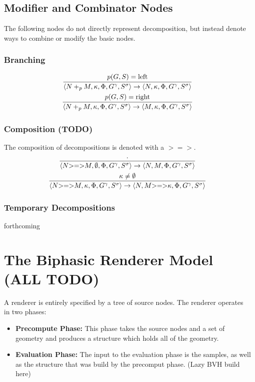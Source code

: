 \documentclass{article}
\newcommand {\comp}{\mathtt{>=>}}
\begin{document}
\subsection{Modifier and Combinator Nodes}
The following nodes do not directly represent decomposition, but instead denote ways to combine or modify the basic nodes.

\subsubsection{Branching}
\begin{gather}
\infer{\langle N +_p M, \kappa, \Phi, G^\gamma, S^\sigma\rangle \to \langle N, \kappa, \Phi, G^\gamma, S^\sigma \rangle}{p(G,S) = \mathrm{left}}
\\
\infer{\langle N +_p M, \kappa, \Phi, G^\gamma, S^\sigma\rangle \to \langle M, \kappa, \Phi, G^\gamma, S^\sigma \rangle}{p(G,S) = \mathrm{right}}
\end{gather}

\subsubsection{Composition (TODO)}
The composition of decompositions is denoted with a $\comp$. 
\begin{gather}
\infer{\langle N \comp M, \emptyset, \Phi, G^\gamma, S^\sigma \rangle \to \langle  N, M, \Phi, G^\gamma, S^\sigma \rangle}{\cdot}
\\
\infer{\langle N \comp M, \kappa, \Phi, G^\gamma, S^\sigma \rangle \to \langle  N, M \comp \kappa, \Phi, G^\gamma, S^\sigma \rangle}{ \kappa \not = \emptyset}
\end{gather}

\subsubsection{Temporary Decompositions}

forthcoming



\section{The Biphasic Renderer Model (ALL TODO)}

A renderer is entirely specified by a tree of source nodes. The renderer operates in two phases:
\begin{itemize}
\item {\bf Precompute Phase:} This phase takes the source nodes and a set of geometry and produces a structure which holds all of the geometry.
\item {\bf Evaluation Phase:} The input to the evaluation phase is the samples, as well as the structure that was build by the precomput phase. (Lazy BVH build here)
\end{itemize}
\end{document}
